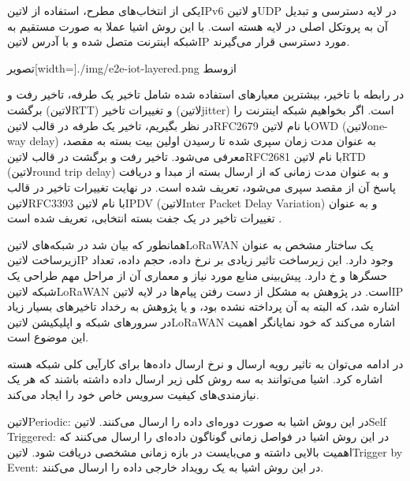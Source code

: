 یکی از انتخاب‌های مطرح، استفاده از ‌لاتین{IPv6} و ‌لاتین{UDP} در لایه دسترسی و تبدیل آن به پروتکل اصلی در لایه هسته است. با این روش
اشیا عملا به صورت مستقیم به شبکه اینترنت متصل شده و با آدرس ‌لاتین{IP} مورد دسترسی قرار می‌گیرند.

‌تصویر[width=\textwidth]{./img/e2e-iot-layered.png}
‌ازوسط

در رابطه با تاخیر، بیشترین معیارهای استفاده شده شامل تاخیر یک طرفه، تاخیر رفت و برگشت (‌لاتین{RTT}) و تغییرات تاخیر (‌لاتین{jitter}) است.
اگر بخواهیم شبکه اینترنت را در نظر بگیریم، تاخیر یک طرفه در قالب ‌لاتین{RFC2679} با نام ‌لاتین{OWD} (‌لاتین{one-way delay}) به عنوان مدت زمان
سپری شده تا رسیدن اولین بیت بسته به مقصد،
معرفی می‌شود. تاخیر رفت و برگشت در قالب ‌لاتین{RFC2681} با نام ‌لاتین{RTD} (‌لاتین{round trip delay}) و به عنوان مدت زمانی
که از ارسال بسته از مبدا و دریافت پاسخ آن از مقصد سپری می‌شود، تعریف شده است.
در نهایت تغییرات تاخیر در قالب ‌لاتین{RFC3393} با نام ‌لاتین{IPDV} (‌لاتین{Inter Packet Delay Variation}) و به عنوان
تغییرات تاخیر در یک جفت بسته انتخابی، تعریف شده است
.


همانطور که بیان شد در شبکه‌های ‌لاتین{LoRaWAN} یک ساختار مشخص به عنوان زیرساخت ‌لاتین{IP} وجود دارد.
این زیرساخت تاثیر زیادی بر نرخ داده، حجم داده، تعداد حسگرها و ‌خ دارد. پیش‌بینی منابع مورد نیاز و معماری آن از مراحل مهم طراحی یک شبکه ‌لاتین{LoRaWAN} است.
در پژوهش  به مشکل از دست رفتن پیام‌ها در لایه ‌لاتین{IP} اشاره شد، که البته به آن پرداخته نشده بود،
و یا پژوهش  به رخداد تاخیرهای بسیار زیاد در سرورهای شبکه و اپلیکیشن ‌لاتین{LoRaWAN} اشاره می‌کند
که خود نمایانگر اهمیت این موضوع است.

در ادامه می‌توان به تاثیر رویه ارسال و نرخ ارسال داده‌ها برای کارآیی کلی شبکه هسته اشاره کرد.
اشیا می‌توانند به سه روش کلی زیر ارسال داده داشته باشند که هر یک نیازمندی‌های کیفیت سرویس خاص خود را ایجاد می‌کند.

 ‌لاتین{Periodic}: در این روش اشیا به صورت دوره‌ای داده را ارسال می‌کنند.
 ‌لاتین{Self Triggered}: در این روش اشیا در فواصل زمانی گوناگون داده‌ای را ارسال می‌کنند که اهمیت بالایی داشته و می‌بایست در بازه زمانی مشخصی دریافت شود.
 ‌لاتین{Trigger by Event}: در این روش اشیا به یک رویداد خارجی داده را ارسال می‌کنند.

